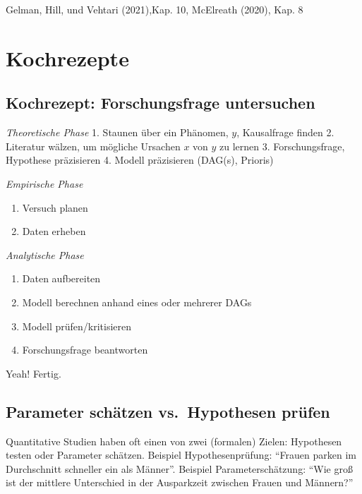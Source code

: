 \documentclass[
  a4paper,
  DIV=11]{scrreprt}
\providecommand{\tightlist}{%
  \setlength{\itemsep}{0pt}\setlength{\parskip}{0pt}}\usepackage{longtable,booktabs,array}
\theoremstyle{definition}
\theoremstyle{remark}
\begin{document}
Gelman, Hill, und Vehtari (2021),Kap. 10, McElreath (2020), Kap. 8

\hypertarget{kochrezepte}{%
\section{Kochrezepte 🍲}\label{kochrezepte}}

\hypertarget{kochrezept-forschungsfrage-untersuchen}{%
\subsection{Kochrezept: Forschungsfrage
untersuchen}\label{kochrezept-forschungsfrage-untersuchen}}

\emph{Theoretische Phase} 1. Staunen über ein Phänomen, \(y\),
Kausalfrage finden 2. Literatur wälzen, um mögliche Ursachen \(x\) von
\(y\) zu lernen 3. Forschungsfrage, Hypothese präzisieren 4. Modell
präzisieren (DAG(s), Prioris)

\emph{Empirische Phase}

\begin{enumerate}
\def\labelenumi{\arabic{enumi}.}
\setcounter{enumi}{4}
\tightlist
\item
  Versuch planen
\item
  Daten erheben
\end{enumerate}

\emph{Analytische Phase}

\begin{enumerate}
\def\labelenumi{\arabic{enumi}.}
\setcounter{enumi}{6}
\tightlist
\item
  Daten aufbereiten
\item
  Modell berechnen anhand eines oder mehrerer DAGs
\item
  Modell prüfen/kritisieren
\item
  Forschungsfrage beantworten
\end{enumerate}

Yeah! Fertig.

\hypertarget{parameter-schuxe4tzen-vs.-hypothesen-pruxfcfen}{%
\subsection{Parameter schätzen vs.~Hypothesen
prüfen}\label{parameter-schuxe4tzen-vs.-hypothesen-pruxfcfen}}

Quantitative Studien haben oft einen von zwei (formalen) Zielen:
Hypothesen testen oder Parameter schätzen. Beispiel Hypothesenprüfung:
``Frauen parken im Durchschnitt schneller ein als Männer''. Beispiel
Parameterschätzung: ``Wie groß ist der mittlere Unterschied in der
Ausparkzeit zwischen Frauen und Männern?''
\end{document}
